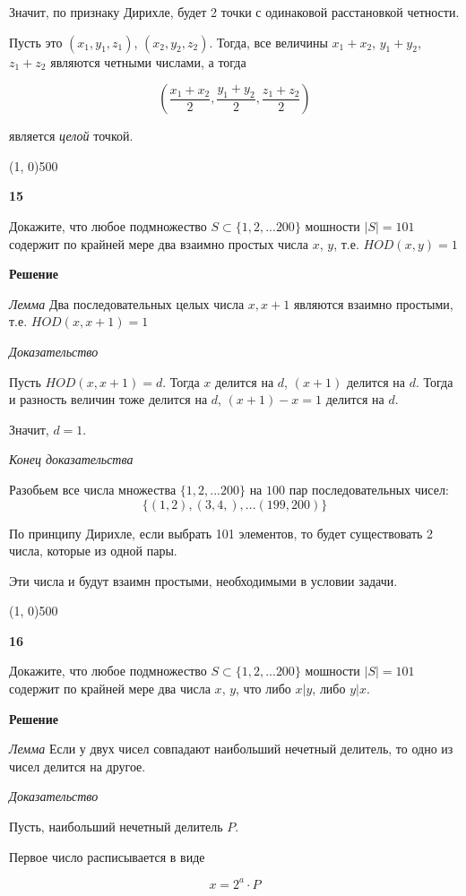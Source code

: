 \documentclass{article}
\begin{document}
Значит, по признаку Дирихле, будет 2 точки с одинаковой расстановкой четности. 

Пусть это $(x_1, y_1, z_1)$, $(x_2, y_2, z_2)$. Тогда, все величины $x_1 + x_2$, $y_1 + y_2$, $z_1 + z_2$  являются четными числами, а тогда

$$\left(\frac{x_1 + x_2}{2}, \frac{y_1 + y_2}{2}, \frac{z_1 + z_2}{2}\right)$$

является \textit{целой} точкой.

\line(1, 0){500}

\textbf{15}

Докажите, что любое подмножество $S \subset \{1, 2, ... 200\}$ мошности $|S | = 101$ содержит по крайней мере два взаимно простых числа $x$, $y$, т.е. $HOD(x, y) = 1$ 

\textbf{Решение}

\textit{Лемма}
Два последовательных целых числа $x, x + 1$ являются взаимно простыми,  т.е. $HOD(x, x + 1) = 1$

\textit{Доказательство}

Пусть $HOD(x, x + 1) = d$. Тогда $x$  делится на $d$, $(x + 1)$ делится на $d$. Тогда и разность величин тоже делится на $d$, $(x + 1) - x = 1$ делится на $d$. 

Значит, $d = 1$.

\textit{Конец доказательства}

Разобьем все числа множества $\{1, 2, ... 200\}$  на $100$ пар последовательных чисел: 
$$ \{ (1, 2), (3, 4,), ... (199, 200) \}$$

По принципу Дирихле, если выбрать 101 элементов, то будет существовать 2 числа, которые из одной пары. 

Эти числа и будут взаимн простыми, необходимыми в условии задачи.

\line(1, 0){500}

\textbf{16}

Докажите, что любое подмножество $S \subset \{1, 2, ... 200\}$ мошности $|S | = 101$ содержит по крайней мере два числа $x$, $y$, что либо $x | y$, либо $y | x$.

\textbf{Решение}


\textit{Лемма}
Если у двух чисел совпадают наибольший нечетный делитель, то одно из чисел делится на другое. 

\textit{Доказательство}

Пусть, наибольший нечетный делитель $P$.

Первое число расписывается в виде 

$$x = 2^a \cdot P$$
\end{document}
